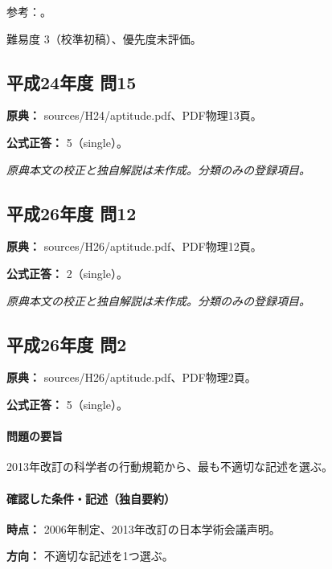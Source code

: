 \par 参考：\cite{scj_code2006}。

\par 難易度 3（校準初稿）、優先度未評価。

\subsection{平成24年度 問15}
\label{q:h24-reg-apt-15}

\noindent\textbf{原典：} sources/H24/aptitude.pdf、PDF物理13頁。

\textbf{公式正答：} 5（single）。

\par\textit{原典本文の校正と独自解説は未作成。分類のみの登録項目。}

\subsection{平成26年度 問12}
\label{q:h26-reg-apt-12}

\noindent\textbf{原典：} sources/H26/aptitude.pdf、PDF物理12頁。

\textbf{公式正答：} 2（single）。

\par\textit{原典本文の校正と独自解説は未作成。分類のみの登録項目。}

\subsection{平成26年度 問2}
\label{q:h26-reg-apt-02}

\noindent\textbf{原典：} sources/H26/aptitude.pdf、PDF物理2頁。

\textbf{公式正答：} 5（single）。

\paragraph{問題の要旨} 2013年改訂の科学者の行動規範から、最も不適切な記述を選ぶ。

\paragraph{確認した条件・記述（独自要約）}\mbox{}\par

\noindent\textbf{時点：} 2006年制定、2013年改訂の日本学術会議声明。\par

\noindent\textbf{方向：} 不適切な記述を1つ選ぶ。\par

